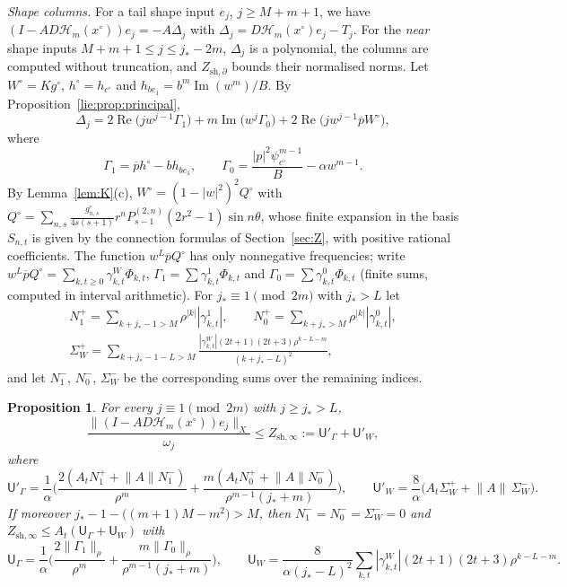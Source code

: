 \documentclass[11pt]{amsart}
\newtheorem{proposition}[theorem]{Proposition}
\theoremstyle{definition}
\theoremstyle{remark}
\numberwithin{equation}{section}
\newcommand{\jst}{j_*}
\newcommand{\sU}{\mathsf{U}}
\DeclareMathOperator{\re}{Re}
\DeclareMathOperator{\im}{Im}
\newcommand{\nrm}[1]{\lVert #1\rVert}
\newcommand{\Hc}{\mathcal{H}}
\begin{document}
\emph{Shape columns.} For a tail shape input $e_j$, $j\geq M+m+1$, we have $(I-AD\Hc_m(x^\circ))e_j=-A\Delta_j$ with $\Delta_j=D\Hc_m(x^\circ)e_j-T_j$. For the \emph{near} shape inputs $M+m+1\leq j\leq\jst-2m$, $\Delta_j$ is a polynomial, the columns are computed without truncation, and $Z_{\mathrm{sh},\partial}$ bounds their normalised norms. Let $W^\circ=Kg^\circ$, $h^\circ=h_{c^\circ}$ and $h_{be_1}=b^m\im(w^m)/B$. By Proposition~\ref{lie:prop:principal},
\begin{equation}\label{lie:eq:Deltaj}
\Delta_j=2\re\big(jw^{j-1}\Gamma_1\big)+m\im\big(w^j\Gamma_0\big)+2\re\big(jw^{j-1}\overline pW^\circ\big),
\end{equation}
where
\[
\Gamma_1=\overline ph^\circ-bh_{be_1},\qquad\Gamma_0=\frac{|p|^2\psi_{c^\circ}^{m-1}}B-\alpha w^{m-1}.
\]
By Lemma~\ref{lem:K}(c), $W^\circ=(1-|w|^2)^2Q^\circ$ with $Q^\circ=\sum_{n,s}\frac{g^\circ_{n,s}}{4s(s+1)}r^nP^{(2,n)}_{s-1}(2r^2-1)\sin n\theta$, whose finite expansion in the basis $S_{n,t}$ is given by the connection formulas of Section~\ref{sec:Z}, with positive rational coefficients. The function $w^L\overline pQ^\circ$ has only nonnegative frequencies; write $w^L\overline pQ^\circ=\sum_{k,t\geq0}\gamma^W_{k,t}\Phi_{k,t}$, $\Gamma_1=\sum\gamma^1_{k,t}\Phi_{k,t}$ and $\Gamma_0=\sum\gamma^0_{k,t}\Phi_{k,t}$ (finite sums, computed in interval arithmetic). For $\jst\equiv1\pmod{2m}$ with $\jst>L$ let
\begin{gather*}
N_1^+=\sum_{k+\jst-1>M}\rho^{|k|}|\gamma^1_{k,t}|,\qquad N_0^+=\sum_{k+\jst>M}\rho^{|k|}|\gamma^0_{k,t}|,\\
\Sigma_W^+=\sum_{k+\jst-1-L>M}\frac{|\gamma^W_{k,t}|(2t+1)(2t+3)\rho^{k-L-m}}{(k+\jst-L)^2},
\end{gather*}
and let $N_1^-$, $N_0^-$, $\Sigma_W^-$ be the corresponding sums over the remaining indices.

\begin{proposition}\label{lie:prop:farshape}
For every $j\equiv1\pmod{2m}$ with $j\geq\jst>L$,
\[
\frac{\nrm{(I-AD\Hc_m(x^\circ))e_j}_X}{\omega_j}\leq Z_{\mathrm{sh},\infty}:=\sU'_\Gamma+\sU'_W,
\]
where
\[
\sU'_\Gamma=\frac1\alpha\Big(\frac{2(A_tN_1^++\nrm AN_1^-)}{\rho^m}+\frac{m(A_tN_0^++\nrm AN_0^-)}{\rho^{m-1}(\jst+m)}\Big),\qquad\sU'_W=\frac8\alpha\big(A_t\Sigma_W^++\nrm A\,\Sigma_W^-\big).
\]
If moreover $\jst-1-\big((m+1)M-m^2\big)>M$, then $N_1^-=N_0^-=\Sigma_W^-=0$ and $Z_{\mathrm{sh},\infty}\leq A_t(\sU_\Gamma+\sU_W)$ with
\[
\sU_\Gamma=\frac1\alpha\Big(\frac{2\nrm{\Gamma_1}_\rho}{\rho^m}+\frac{m\nrm{\Gamma_0}_\rho}{\rho^{m-1}(\jst+m)}\Big),\qquad\sU_W=\frac{8}{\alpha(\jst-L)^2}\sum_{k,t}|\gamma^W_{k,t}|(2t+1)(2t+3)\rho^{k-L-m}.
\]
\end{proposition}
\end{document}
